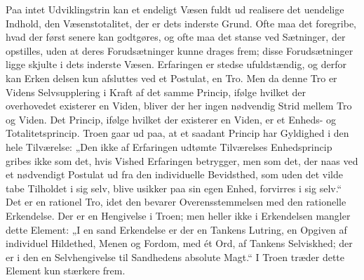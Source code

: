 \documentclass[12pt,a4paper,openany]{book}
\newcommand{\opage}[1]{\marginnote{\footnotesize\textit{[#1]}}}
\begin{document}
Paa intet Udviklingstrin kan et endeligt Væsen fuldt ud realisere det uendelige
Indhold, den Væsenstotalitet, der er dets inderste Grund. Ofte maa det
foregribe, hvad der først senere kan godtgøres, og ofte maa det stanse ved
Sætninger, der opstilles, uden at deres Forudsætninger kunne drages frem; disse
Forudsætninger ligge skjulte i dets inderste Væsen. Erfaringen er stedse
ufuldstændig, og derfor kan Erken%
\setcounter{footnote}{0}%
\opage{203}delsen kun afsluttes ved et Postulat, en Tro. Men da denne Tro er
Videns Selvsupplering i Kraft af det samme Princip, ifølge hvilket der
overhovedet existerer en Viden, bliver der her ingen nødvendig Strid mellem Tro
og Viden. Det Princip, ifølge hvilket der existerer en Viden, er et Enheds- og
Totalitetsprincip. Troen gaar ud paa, at et saadant Princip har Gyldighed i den
hele Tilværelse: „Den ikke af Erfaringen udtømte Tilværelses Enhedsprincip
gribes ikke som det, hvis Vished Erfaringen betrygger, men som det, der naas
ved et nødvendigt Postulat ud fra den individuelle Bevidsthed, som uden det
vilde tabe Tilholdet i sig selv, blive usikker paa sin egen Enhed, forvirres i
sig selv.“ Det er en rationel Tro, idet den bevarer Overensstemmelsen med den
rationelle Erkendelse. Der er en Hengivelse i Troen; men heller ikke i
Erkendelsen mangler dette Element: „I en sand Erkendelse er der en Tankens
Lutring, en Opgiven af individuel Hildethed, Menen og Fordom, med ét Ord, af
Tankens Selviskhed; der er i den en Selvhengivelse til Sandhedens absolute
Magt.“ I Troen træder dette Element kun stærkere frem.
\end{document}
